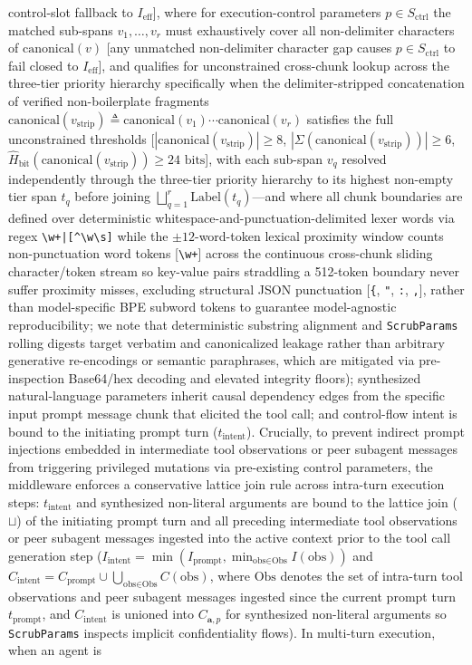 \documentclass[conference,10pt]{IEEEtran}
\begin{document}
control-slot fallback to $I_{\text{eff}}$], where for execution-control parameters $p \in S_{\text{ctrl}}$ the matched sub-spans $v_1, \dots, v_r$ must exhaustively cover all non-delimiter characters of $\text{canonical}(v)$ [any unmatched non-delimiter character gap causes $p \in S_{\text{ctrl}}$ to fail closed to $I_{\text{eff}}$], and qualifies for unconstrained cross-chunk lookup across the three-tier priority hierarchy specifically when the delimiter-stripped concatenation of verified non-boilerplate fragments $\text{canonical}(v_{\text{strip}}) \triangleq \text{canonical}(v_1) \cdots \text{canonical}(v_r)$ satisfies the full unconstrained thresholds [$|\text{canonical}(v_{\text{strip}})| \ge 8$, $|\Sigma(\text{canonical}(v_{\text{strip}}))| \ge 6$, $\hat{H}_{\text{bit}}(\text{canonical}(v_{\text{strip}})) \ge 24\text{ bits}$], with each sub-span $v_q$ resolved independently through the three-tier priority hierarchy to its highest non-empty tier span $t_q$ before joining $\bigsqcup_{q=1}^r \text{Label}(t_q)$---and where all chunk boundaries are defined over deterministic whitespace-and-punctuation-delimited lexer words via regex \texttt{\textbackslash w+|[\textasciicircum{}\textbackslash w\textbackslash s]} while the $\pm 12$-word-token lexical proximity window counts non-punctuation word tokens [\texttt{\textbackslash w+}] across the continuous cross-chunk sliding character/token stream so key-value pairs straddling a 512-token boundary never suffer proximity misses, excluding structural JSON punctuation [\texttt{\{}, \texttt{"}, \texttt{:}, \texttt{,}], rather than model-specific BPE subword tokens to guarantee model-agnostic reproducibility; we note that deterministic substring alignment and \texttt{ScrubParams} rolling digests target verbatim and canonicalized leakage rather than arbitrary generative re-encodings or semantic paraphrases, which are mitigated via pre-inspection Base64/hex decoding and elevated integrity floors); synthesized natural-language parameters inherit causal dependency edges from the specific input prompt message chunk that elicited the tool call; and control-flow intent is bound to the initiating prompt turn ($t_{\text{intent}}$). Crucially, to prevent indirect prompt injections embedded in intermediate tool observations or peer subagent messages from triggering privileged mutations via pre-existing control parameters, the middleware enforces a conservative lattice join rule across intra-turn execution steps: $t_{\text{intent}}$ and synthesized non-literal arguments are bound to the lattice join ($\sqcup$) of the initiating prompt turn and all preceding intermediate tool observations or peer subagent messages ingested into the active context prior to the tool call generation step ($I_{\text{intent}} = \min(I_{\text{prompt}}, \min_{\text{obs} \in \text{Obs}} I(\text{obs}))$ and $C_{\text{intent}} = C_{\text{prompt}} \cup \textstyle\bigcup_{\text{obs} \in \text{Obs}} C(\text{obs})$, where $\text{Obs}$ denotes the set of intra-turn tool observations and peer subagent messages ingested since the current prompt turn $t_{\text{prompt}}$, and $C_{\text{intent}}$ is unioned into $C_{\mathbf{a}, p}$ for synthesized non-literal arguments so \texttt{ScrubParams} inspects implicit confidentiality flows). In multi-turn execution, when an agent is 
\end{document}
